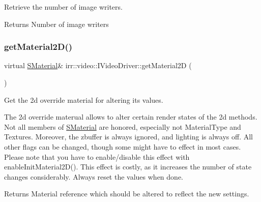 Retrieve the number of image writers. 

\begin{DoxyReturn}{Returns}
Number of image writers 
\end{DoxyReturn}
\mbox{\label{classirr_1_1video_1_1IVideoDriver_a198bbe60fdb1b5d6d0f4921e8a26109c}} 
\subsubsection{\texorpdfstring{get\+Material2\+D()}{getMaterial2D()}\hspace{0.1cm}{\footnotesize\ttfamily [1/2]}}
{\footnotesize\ttfamily virtual \hyperlink{classirr_1_1video_1_1SMaterial}{S\+Material}\& irr\+::video\+::\+I\+Video\+Driver\+::get\+Material2D (\begin{DoxyParamCaption}{ }\end{DoxyParamCaption})\hspace{0.3cm}{\ttfamily [pure virtual]}}



Get the 2d override material for altering its values. 

The 2d override materual allows to alter certain render states of the 2d methods. Not all members of \hyperlink{classirr_1_1video_1_1SMaterial}{S\+Material} are honored, especially not Material\+Type and Textures. Moreover, the zbuffer is always ignored, and lighting is always off. All other flags can be changed, though some might have to effect in most cases. Please note that you have to enable/disable this effect with enable\+Init\+Material2\+D(). This effect is costly, as it increases the number of state changes considerably. Always reset the values when done. \begin{DoxyReturn}{Returns}
Material reference which should be altered to reflect the new settings. 
\end{DoxyReturn}
\mbox{\label{classirr_1_1video_1_1IVideoDriver_a198bbe60fdb1b5d6d0f4921e8a26109c}} 
